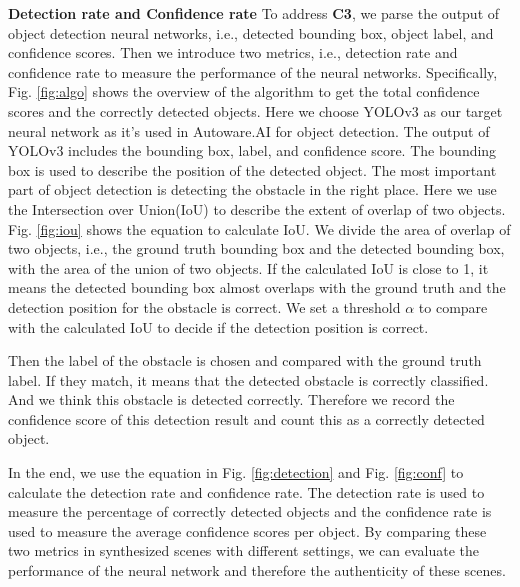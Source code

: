 \textbf{Detection rate and Confidence rate}
To address \textbf{C3}, we parse the output of object detection neural networks, i.e., detected bounding box, object label, and confidence scores.
Then we introduce two metrics, i.e., detection rate and confidence rate to measure the performance of the neural networks.
Specifically, Fig. \ref{fig:algo} shows the overview of the algorithm to get the total confidence scores and the correctly detected objects.
Here we choose YOLOv3 as our target neural network as it's used in Autoware.AI\cite{autoware} for object detection. 
The output of YOLOv3 includes the bounding box, label, and confidence score.
The bounding box is used to describe the position of the detected object. 
The most important part of object detection is detecting the obstacle in the right place.
Here we use the Intersection over Union(IoU) to describe the extent of overlap of two objects.
Fig. \ref{fig:iou} shows the equation to calculate IoU.
We divide the area of overlap of two objects, i.e., the ground truth bounding box and the detected bounding box, with the area of the union of two objects.
If the calculated IoU is close to 1, it means the detected bounding box almost overlaps with the ground truth and the detection position for the obstacle is correct.
We set a threshold $\alpha$ to compare with the calculated IoU to decide if the detection position is correct.

Then the label of the obstacle is chosen and compared with the ground truth label.
If they match, it means that the detected obstacle is correctly classified.
And we think this obstacle is detected correctly. 
Therefore we record the confidence score of this detection result and count this as a correctly detected object.

In the end, we use the equation in Fig. \ref{fig:detection} and Fig. \ref{fig:conf} to calculate the detection rate and confidence rate.
The detection rate is used to measure the percentage of correctly detected objects 
and the confidence rate is used to measure the average confidence scores per object.
By comparing these two metrics in synthesized scenes with different settings, 
we can evaluate the performance of the neural network and therefore the authenticity of these scenes.

